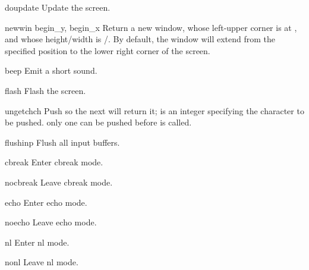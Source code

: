 \begin{funcdesc}{doupdate}{}
Update the screen.
\end{funcdesc}

\begin{funcdesc}{newwin}{ begin_y, begin_x}
Return a new window, whose left-upper corner is at 
, and whose height/width is 
/.  By default, the window will extend from the 
specified position to the lower right corner of the screen.
\end{funcdesc}

\begin{funcdesc}{beep}{}
Emit a short sound.
\end{funcdesc}

\begin{funcdesc}{flash}{}
Flash the screen.
\end{funcdesc}

\begin{funcdesc}{ungetch}{ch}
Push  so the next  will return it;  is 
an integer specifying the character to be pushed.
 only one  can be pushed before 
is called.
\end{funcdesc}

\begin{funcdesc}{flushinp}{}
Flush all input buffers.
\end{funcdesc}

\begin{funcdesc}{cbreak}{}
Enter cbreak mode.
\end{funcdesc}

\begin{funcdesc}{nocbreak}{}
Leave cbreak mode.
\end{funcdesc}

\begin{funcdesc}{echo}{}
Enter echo mode.
\end{funcdesc}

\begin{funcdesc}{noecho}{}
Leave echo mode.
\end{funcdesc}

\begin{funcdesc}{nl}{}
Enter nl mode.
\end{funcdesc}

\begin{funcdesc}{nonl}{}
Leave nl mode.
\end{funcdesc}

